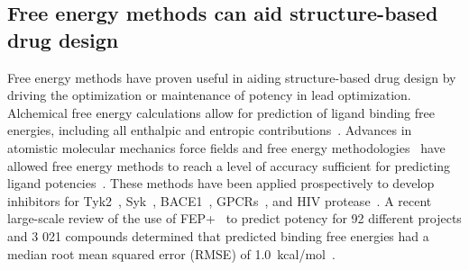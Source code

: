 \documentclass[phd,tocprelim]{cornell}
\begin{document}
\subsection{Free energy methods can aid structure-based drug design}
Free energy methods have proven useful in aiding structure-based drug design by driving the optimization or maintenance of potency in lead optimization. Alchemical free energy calculations allow for prediction of ligand binding free energies, including all enthalpic and entropic contributions~\citep{Chodera2011-jn}. 
Advances in atomistic molecular mechanics force fields and free energy methodologies~\citep{Huang:J.Comput.Chem.:2013,Maier:J.Chem.TheoryComput.:2015,Harder:J.Chem.TheoryComput.:2016,Cournia:2017ip} have allowed free energy methods to reach a level of accuracy  sufficient for predicting ligand potencies~\citep{BROWN2009420}. 
These methods have been applied prospectively to develop inhibitors for Tyk2~\citep{Abel2017-gw}, Syk~\citep{Lovering:2016fg}, BACE1~\citep{Ciordia:2016dn}, GPCRs~\citep{Lenselink:2016ip}, and HIV protease~\citep{Jorgensen:2016dv}. 
A recent large-scale review of the use of FEP+~\citep{Wang:J.Am.Chem.Soc.:2015} to predict potency for 92 different projects and 3 021 compounds determined that predicted binding free energies had a median root mean squared error (RMSE) of 1.0~kcal/mol~\citep{Abel:2017jt}. 
\end{document}
